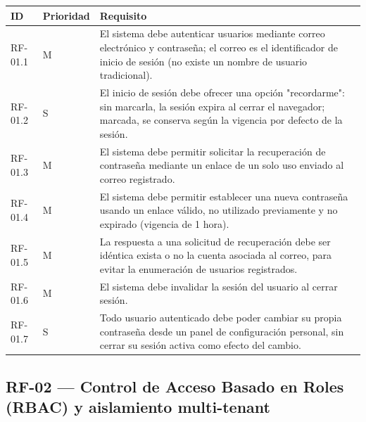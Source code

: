 \documentclass[12pt,a4paper]{report}
\begin{document}
\begin{longtable}{|p{2cm}|p{2cm}|p{10cm}|}
\hline
\textbf{ID} & \textbf{Prioridad} & \textbf{Requisito} \\ \hline
RF-01.1 & M & El sistema debe autenticar usuarios mediante correo electrónico y contraseña; el correo es el identificador de inicio de sesión (no existe un nombre de usuario tradicional). \\ \hline
RF-01.2 & S & El inicio de sesión debe ofrecer una opción "recordarme": sin marcarla, la sesión expira al cerrar el navegador; marcada, se conserva según la vigencia por defecto de la sesión. \\ \hline
RF-01.3 & M & El sistema debe permitir solicitar la recuperación de contraseña mediante un enlace de un solo uso enviado al correo registrado. \\ \hline
RF-01.4 & M & El sistema debe permitir establecer una nueva contraseña usando un enlace válido, no utilizado previamente y no expirado (vigencia de 1 hora). \\ \hline
RF-01.5 & M & La respuesta a una solicitud de recuperación debe ser idéntica exista o no la cuenta asociada al correo, para evitar la enumeración de usuarios registrados. \\ \hline
RF-01.6 & M & El sistema debe invalidar la sesión del usuario al cerrar sesión. \\ \hline
RF-01.7 & S & Todo usuario autenticado debe poder cambiar su propia contraseña desde un panel de configuración personal, sin cerrar su sesión activa como efecto del cambio. \\ \hline
\end{longtable}

\subsection{RF-02 --- Control de Acceso Basado en Roles (RBAC) y aislamiento multi-tenant}
\end{document}
